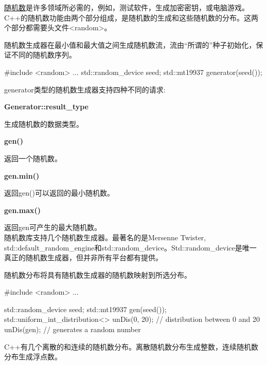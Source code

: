 \href{http://en.cppreference.com/w/cpp/header/random}{随机数}是许多领域所必需的，例如，测试软件，生成加密密钥，或电脑游戏。C++的随机数功能由两个部分组成，是随机数的生成和这些随机数的分布。这两个部分都需要头文件<random>。


随机数生成器在最小值和最大值之间生成随机数流，流由“所谓的”种子初始化，保证不同的随机数序列。

\begin{cpp}
#include <random>
...
std::random_device seed;
std::mt19937 generator(seed());
\end{cpp}

generator类型的随机数生成器支持四种不同的请求:

\noindent
\textbf{Generator::result\_type}

生成随机数的数据类型。

\noindent
\textbf{gen()}

返回一个随机数。

\noindent
\textbf{gen.min()}

返回gen()可以返回的最小随机数。

\noindent
\textbf{gen.max()}

返回gen可产生的最大随机数。 \\

随机数库支持几个随机数生成器。最著名的是Mersenne Twister, std::default\_random\_engine和std::random\_device。Std::random\_device是唯一真正的随机数生成器，但并非所有平台都有提供。


随机数分布将具有随机数生成器的随机数映射到所选分布。

\begin{cpp}
#include <random>
...

std::random_device seed;
std::mt19937 gen(seed());
std::uniform_int_distribution<> unDis(0, 20); // distribution between 0 and 20
unDis(gen); // generates a random number
\end{cpp}

C++有几个离散的和连续的随机数分布。离散随机数分布生成整数，连续随机数分布生成浮点数。

